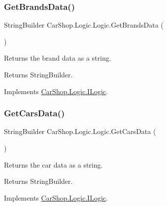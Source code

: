 \subsubsection{\texorpdfstring{Get\+Brands\+Data()}{GetBrandsData()}}
{\footnotesize\ttfamily String\+Builder Car\+Shop.\+Logic.\+Logic.\+Get\+Brands\+Data (\begin{DoxyParamCaption}{ }\end{DoxyParamCaption})}



Returns the brand data as a string. 

\begin{DoxyReturn}{Returns}
String\+Builder.
\end{DoxyReturn}


Implements \mbox{\hyperlink{interface_car_shop_1_1_logic_1_1_i_logic_a3fad1ae2fa55b77fedf2688e9915f376}{Car\+Shop.\+Logic.\+I\+Logic}}.

\mbox{\label{class_car_shop_1_1_logic_1_1_logic_a74048c2231e34ae8d86a5357a073f0cd}} 
\subsubsection{\texorpdfstring{Get\+Cars\+Data()}{GetCarsData()}}
{\footnotesize\ttfamily String\+Builder Car\+Shop.\+Logic.\+Logic.\+Get\+Cars\+Data (\begin{DoxyParamCaption}{ }\end{DoxyParamCaption})}



Returns the car data as a string. 

\begin{DoxyReturn}{Returns}
String\+Builder.
\end{DoxyReturn}


Implements \mbox{\hyperlink{interface_car_shop_1_1_logic_1_1_i_logic_a8e19c6c27464776cae749bb71888716d}{Car\+Shop.\+Logic.\+I\+Logic}}.

\mbox{\label{class_car_shop_1_1_logic_1_1_logic_ac829fe0e30078fca2abc5eb64eea4f62}} 

